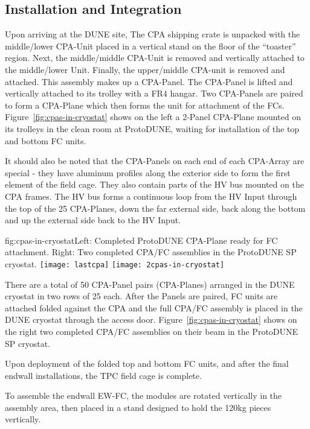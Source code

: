 \subsection{Installation and Integration}
\label{sec:fdsp-hv-integration}
Upon arriving at the DUNE site, The CPA shipping crate is unpacked with the middle/lower CPA-Unit placed in a vertical stand on the floor of the ``toaster'' region.  Next, the middle/middle CPA-Unit is removed and vertically attached to the middle/lower Unit.  Finally, the upper/middle CPA-unit is removed and attached.  This assembly makes up a CPA-Panel.  The CPA-Panel is lifted and vertically attached to its trolley with a FR4 hangar.  Two CPA-Panels are paired to form a CPA-Plane which then forms the unit for attachment of the FCs.  Figure~\ref{fig:cpas-in-cryostat} shows on the left a 2-Panel CPA-Plane mounted on its trolleys in the clean room at ProtoDUNE, waiting for installation of the top and bottom FC units.

It should also be noted that the CPA-Panels on each end of each CPA-Array are special - they have aluminum profiles along the exterior side to form the first element of the field cage.  They also contain parts of the HV bus mounted on the CPA frames.  The HV bus forms a continuous loop from the HV Input through the top of the 25 CPA-Planes, down the far external side, back along the bottom and up the  external side back to the HV Input.

\begin{dunefigure}{fig:cpas-in-cryostat}{Left: Completed ProtoDUNE CPA-Plane ready for FC attachment. Right: Two completed CPA/FC assemblies in the ProtoDUNE SP cryostat.}
\texttt{[image: lastcpa]}
\texttt{[image: 2cpas-in-cryostat]}
\end{dunefigure}

There are a total of 50 CPA-Panel pairs (CPA-Planes) arranged in the DUNE cryostat in two rows of 25 each.  After the Panels are paired, FC units are attached folded against the CPA and the full CPA/FC assembly is placed in the DUNE cryostat through the access door.  Figure~\ref{fig:cpas-in-cryostat} shows on the right two completed CPA/FC assemblies on their beam in the ProtoDUNE SP cryostat.


Upon deployment of the folded top and bottom FC units, and after the final endwall installations, the TPC field cage is complete.

To assemble the endwall EW-FC, the modules are rotated vertically in the assembly area, then placed in a stand designed to hold the 120kg pieces vertically.

